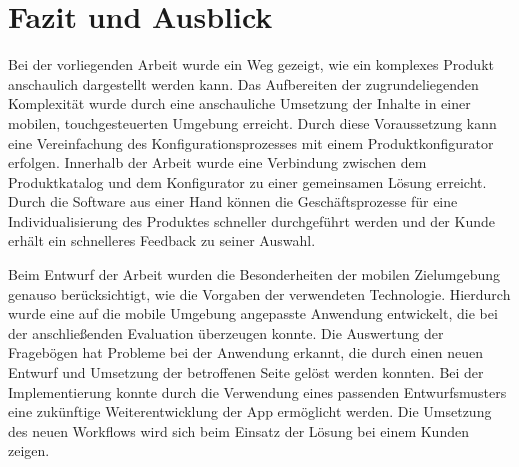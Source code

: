 \chapter{Fazit und Ausblick}\label{chapter_7}
Bei der vorliegenden Arbeit wurde ein Weg gezeigt, wie ein komplexes Produkt anschaulich dargestellt werden kann. Das Aufbereiten der zugrundeliegenden Komplexität wurde durch eine anschauliche Umsetzung der Inhalte in einer mobilen, touchgesteuerten Umgebung erreicht. Durch diese Voraussetzung kann eine Vereinfachung des Konfigurationsprozesses mit einem Produktkonfigurator erfolgen. Innerhalb der Arbeit wurde eine Verbindung zwischen dem Produktkatalog und dem Konfigurator zu einer gemeinsamen Lösung erreicht.  Durch die Software aus einer Hand können die Geschäftsprozesse für eine Individualisierung des Produktes schneller durchgeführt werden und der Kunde erhält ein schnelleres Feedback zu seiner Auswahl. \par 

Beim Entwurf der Arbeit wurden die Besonderheiten der mobilen Zielumgebung genauso berücksichtigt, wie die Vorgaben der verwendeten Technologie. Hierdurch wurde eine auf die mobile Umgebung angepasste Anwendung entwickelt, die bei der anschließenden Evaluation überzeugen konnte. Die Auswertung der Fragebögen hat Probleme bei der Anwendung erkannt, die durch einen neuen Entwurf und Umsetzung der betroffenen Seite gelöst werden konnten. Bei der Implementierung konnte durch die Verwendung eines passenden Entwurfsmusters eine zukünftige Weiterentwicklung der App ermöglicht werden. Die Umsetzung des neuen Workflows wird sich beim Einsatz der Lösung bei einem Kunden zeigen. 